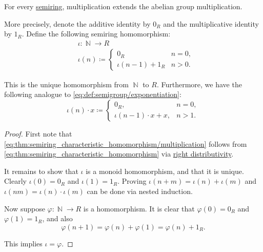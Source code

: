 \begin{proposition}\label{thm:semiring_characteristic_homomorphism}
  For every \hyperref[def:semiring/identity]{semiring}, multiplication extends the abelian group multiplication.

  More precisely, denote the additive identity by \( 0_R \) and the multiplicative identity by \( 1_R \). Define the following semiring homomorphism:
  \begin{equation}\label{eq:thm:semiring_characteristic_homomorphism}
    \begin{aligned}
      &\iota: \BbbN \to R \\
      &\iota(n) \coloneqq \begin{cases}
        0_R                &n = 0, \\
        \iota(n - 1) + 1_R &n > 0.
      \end{cases}
    \end{aligned}
  \end{equation}

  This is the unique homomorphism from \( \BbbN \) to \( R \). Furthermore, we have the following analogue to \eqref{eq:def:semigroup/exponentiation}:
  \begin{equation}\label{eq:thm:semiring_characteristic_homomorphism/multiplication}
    \iota(n) \cdot x \coloneqq \begin{cases}
      0_R,                      &n = 0, \\
      \iota(n - 1) \cdot x + x, &n > 1.
    \end{cases}
  \end{equation}
\end{proposition}
\begin{proof}
  First note that \eqref{eq:thm:semiring_characteristic_homomorphism/multiplication} follows from \eqref{eq:thm:semiring_characteristic_homomorphism} via \hyperref[def:semiring/right_distributivity]{right distributivity}.

  It remains to show that \( \iota \) is a monoid homomorphism, and that it is unique. Clearly \( \iota(0) = 0_R \) and \( \iota(1) = 1_R \). Proving \( \iota(n + m) = \iota(n) + \iota(m) \) and \( \iota(nm) = \iota(n) \cdot \iota(m) \) can be done via nested induction.

  Now suppose \( \varphi: \BbbN \to R \) is a homomorphism. It is clear that \( \varphi(0) = 0_R \) and \( \varphi(1) = 1_R \), and also
  \begin{equation*}
    \varphi(n + 1) = \varphi(n) + \varphi(1) = \varphi(n) + 1_R.
  \end{equation*}

  This implies \( \iota = \varphi \).
\end{proof}

